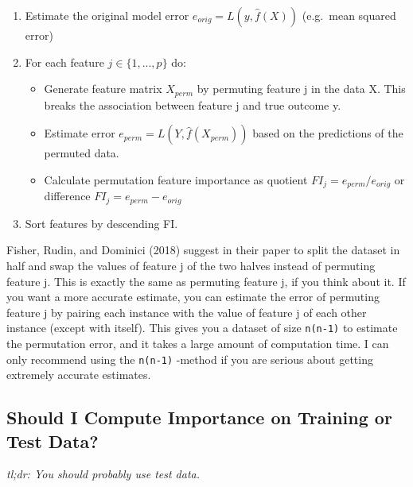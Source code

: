 \documentclass[
  10pt,
]{scrbook}
\providecommand{\tightlist}{%
  \setlength{\itemsep}{0pt}\setlength{\parskip}{0pt}}
\begin{document}
\begin{enumerate}
\def\labelenumi{\arabic{enumi}.}
\tightlist
\item
  Estimate the original model error \(e_{orig} = L(y, \hat{f}(X))\) (e.g.~mean squared error)
\item
  For each feature \(j \in \{1,...,p\}\) do:

  \begin{itemize}
  \tightlist
  \item
    Generate feature matrix \(X_{perm}\) by permuting feature j in the data X. This breaks the association between feature j and true outcome y.
  \item
    Estimate error \(e_{perm} = L(Y,\hat{f}(X_{perm}))\) based on the predictions of the permuted data.
  \item
    Calculate permutation feature importance as quotient \(FI_j= e_{perm}/e_{orig}\) or difference \(FI_j = e_{perm}- e_{orig}\)
  \end{itemize}
\item
  Sort features by descending FI.
\end{enumerate}

Fisher, Rudin, and Dominici (2018) suggest in their paper to split the dataset in half and swap the values of feature j of the two halves instead of permuting feature j.
This is exactly the same as permuting feature j, if you think about it.
If you want a more accurate estimate, you can estimate the error of permuting feature j by pairing each instance with the value of feature j of each other instance (except with itself).
This gives you a dataset of size \texttt{n(n-1)} to estimate the permutation error, and it takes a large amount of computation time.
I can only recommend using the \texttt{n(n-1)} -method if you are serious about getting extremely accurate estimates.

\hypertarget{feature-importance-data}{%
\subsection{Should I Compute Importance on Training or Test Data?}\label{feature-importance-data}}

\emph{tl;dr: You should probably use test data.}
\end{document}
